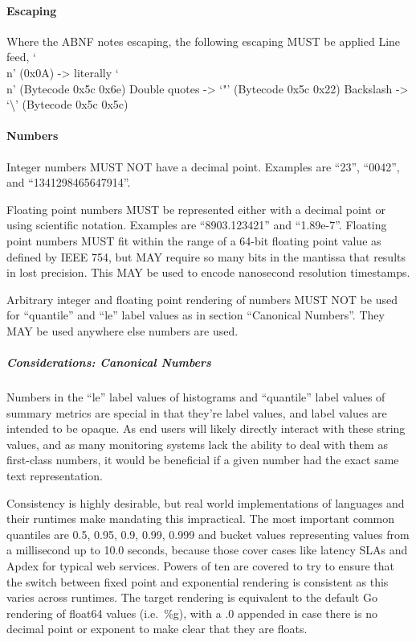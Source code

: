\documentclass[a4paper,12pt,notitlepage,twoside,openright]{article}
\begin{document}
\hypertarget{escaping}{%
\paragraph{Escaping}\label{escaping}}

Where the ABNF notes escaping, the following escaping MUST be applied
Line feed, `\\n' (0x0A) -\textgreater{} literally `\\n' (Bytecode 0x5c
0x6e) Double quotes -\textgreater{} `"' (Bytecode 0x5c 0x22) Backslash
-\textgreater{} `\textbackslash{}' (Bytecode 0x5c 0x5c)

\hypertarget{numbers}{%
\paragraph{Numbers}\label{numbers}}

Integer numbers MUST NOT have a decimal point. Examples are ``23'',
``0042'', and ``1341298465647914''.

Floating point numbers MUST be represented either with a decimal point
or using scientific notation. Examples are ``8903.123421'' and
``1.89e-7''. Floating point numbers MUST fit within the range of a
64-bit floating point value as defined by IEEE 754, but MAY require so
many bits in the mantissa that results in lost precision. This MAY be
used to encode nanosecond resolution timestamps.

Arbitrary integer and floating point rendering of numbers MUST NOT be
used for ``quantile'' and ``le'' label values as in section ``Canonical
Numbers''. They MAY be used anywhere else numbers are used.

\hypertarget{considerations-canonical-numbers}{%
\subparagraph{Considerations: Canonical
Numbers}\label{considerations-canonical-numbers}}

Numbers in the ``le'' label values of histograms and ``quantile'' label
values of summary metrics are special in that they're label values, and
label values are intended to be opaque. As end users will likely
directly interact with these string values, and as many monitoring
systems lack the ability to deal with them as first-class numbers, it
would be beneficial if a given number had the exact same text
representation.

Consistency is highly desirable, but real world implementations of
languages and their runtimes make mandating this impractical. The most
important common quantiles are 0.5, 0.95, 0.9, 0.99, 0.999 and bucket
values representing values from a millisecond up to 10.0 seconds,
because those cover cases like latency SLAs and Apdex for typical web
services. Powers of ten are covered to try to ensure that the switch
between fixed point and exponential rendering is consistent as this
varies across runtimes. The target rendering is equivalent to the
default Go rendering of float64 values (i.e.~\%g), with a .0 appended in
case there is no decimal point or exponent to make clear that they are
floats.
\end{document}
